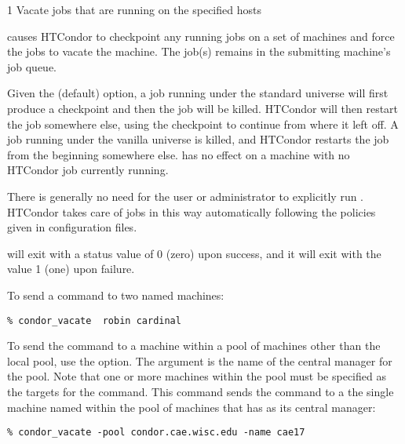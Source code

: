 \begin{ManPage}{\label{man-condor-vacate}}{1}
{Vacate jobs that are running on the specified hosts}

\Synopsis {}
\ToolArgsBase

\ToolDebugOption
\ToolWhere

\Description
{} causes HTCondor to checkpoint any running jobs
on a set of machines
and force the jobs to vacate the machine.
The job(s) remains in
the submitting machine's job queue. 

Given the (default)  option,
a job running under the standard universe
will first produce a checkpoint and then the job will be killed.
HTCondor will then restart the job somewhere else, using the checkpoint to
continue from where it left off.
A job running under the vanilla universe
is killed, and HTCondor
restarts the job from the beginning somewhere else.
 has no effect on a machine with 
no HTCondor job currently running. 

There is generally no need for the user or administrator to explicitly run
.
HTCondor takes care of jobs in this way
automatically following the policies given in configuration files.   

\begin{Options}
	\ToolArgsBaseDesc
	\ToolDebugDesc
	\ToolArgsLocateDesc
\end{Options}

\ExitStatus

 will exit with a status value of 0 (zero) upon success,
and it will exit with the value 1 (one) upon failure.

\Examples
To send a  command to two named machines:
\begin{verbatim}
% condor_vacate  robin cardinal
\end{verbatim}

To send the  command to a machine
within a pool of machines other than the local pool,
use the  option.
The argument is the name of the central manager for the pool.
Note that one or more machines within the pool must be
specified as the targets for the command.
This command sends the command to
a the single machine named  within the
pool of machines that has  as
its central manager:
\begin{verbatim}
% condor_vacate -pool condor.cae.wisc.edu -name cae17
\end{verbatim}

\end{ManPage}
